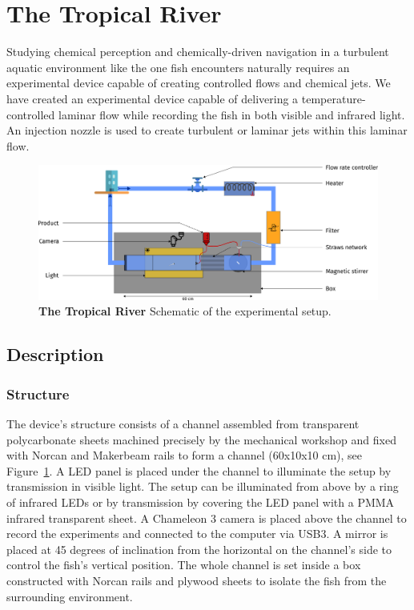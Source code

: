   \section{The Tropical River}
  Studying chemical perception and chemically-driven navigation in a turbulent aquatic environment like the one fish encounters naturally requires an experimental device capable of creating controlled flows and chemical jets. We have created an experimental device capable of delivering a temperature-controlled laminar flow while recording the fish in both visible and infrared light. An injection nozzle is used to create turbulent or laminar jets within this laminar flow.

    \begin{figure}[h!]
      \centering
      \includegraphics[width=1\textwidth]{part_2/assets/river.png}
      \caption{\textbf{The Tropical River} Schematic of the experimental setup.}
      \label{river}
    \end{figure}

\subsection{Description}
  \subsubsection{Structure}
  The device's structure consists of a channel assembled from transparent polycarbonate sheets machined precisely by the mechanical workshop and fixed with Norcan and Makerbeam rails to form a channel (60x10x10 cm), see Figure~\ref{river}. A LED panel is placed under the channel to illuminate the setup by transmission in visible light. The setup can be illuminated from above by a ring of infrared LEDs or by transmission by covering the LED panel with a PMMA infrared transparent sheet. A Chameleon 3 camera is placed above the channel to record the experiments and connected to the computer via USB3. A mirror is placed at 45 degrees of inclination from the horizontal on the channel's side to control the fish's vertical position. The whole channel is set inside a box constructed with Norcan rails and plywood sheets to isolate the fish from the surrounding environment.

